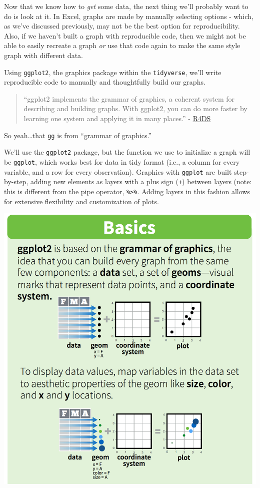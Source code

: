 \documentclass[]{book}
\begin{document}
Now that we know how to \emph{get} some data, the next thing we'll probably want to do is look at it. In Excel, graphs are made by manually selecting options - which, as we've discussed previously, may not be the best option for reproducibility. Also, if we haven't built a graph with reproducible code, then we might not be able to easily recreate a graph \emph{or} use that code again to make the same style graph with different data.

Using \texttt{ggplot2}, the graphics package within the \texttt{tidyverse}, we'll write reproducible code to manually and thoughtfully build our graphs.

\begin{quote}
``ggplot2 implements the grammar of graphics, a coherent system for describing and building graphs. With ggplot2, you can do more faster by learning one system and applying it in many places.'' - \href{http://r4ds.had.co.nz/data-visualisation.html}{R4DS}
\end{quote}

So yeah\ldots{}that \texttt{gg} is from ``grammar of graphics.''

We'll use the \texttt{ggplot2} package, but the function we use to initialize a graph will be \texttt{ggplot}, which works best for data in tidy format (i.e., a column for every variable, and a row for every observation). Graphics with \texttt{ggplot} are built step-by-step, adding new elements as layers with a plus sign (\texttt{+}) between layers (note: this is different from the pipe operator, \texttt{\%\textgreater{}\%}. Adding layers in this fashion allows for extensive flexibility and customization of plots.

\includegraphics{img/rstudio-cheatsheet-ggplot.png}
\end{document}
